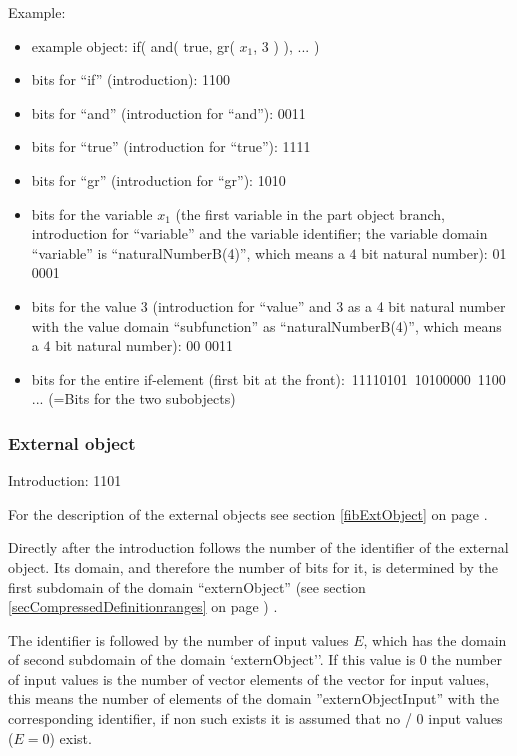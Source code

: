 \bigskip\noindent
Example:
\begin{itemize}
 \item example object: if( and( true, gr( $x_1$, 3 ) ), ... )
 \item bits for ``if'' (introduction): 1100
 \item bits for ``and'' (introduction for ``and''): 0011
 \item bits for ``true'' (introduction for ``true''): 1111
 \item bits for ``gr'' (introduction for ``gr''): 1010
 \item bits for the variable $x_1$ (the first variable in the part object branch, introduction for ``variable'' and the variable identifier; the variable domain ``variable'' is ``naturalNumberB(4)'', which means a $4$ bit natural number): 01 0001
 \item bits for the value 3 (introduction for ``value'' and 3 as a 4 bit natural number with the value domain ``subfunction'' as ``naturalNumberB(4)'', which means a $4$ bit natural number): 00 0011
 \item bits for the entire if-element (first bit at the front):\ 11110101\ 10100000\ 1100 ... (=Bits for the two subobjects)
\end{itemize}



\subsubsection{External object}
\label{secCompressedExternObjects}

Introduction: 1101

\bigskip\noindent
For the description of the external objects see section \ref{fibExtObject} on page \pageref{fibExtObject} .

Directly after the introduction follows the number of the identifier of the external object. Its domain, and therefore the number of bits for it, is determined by the first subdomain of the domain ``externObject'' (see section \ref{secCompressedDefinitionranges} on page \pageref{secCompressedDefinitionranges}) .

The identifier is followed by the number of input values $E$, which has the domain of second subdomain of the domain `externObject''. If this value is $0$ the number of input values is the number of vector elements of the vector for input values, this means the number of elements of the domain ''externObjectInput'' with the corresponding identifier, if non such exists it is assumed that no / $0$ input values ($E=0$) exist.

